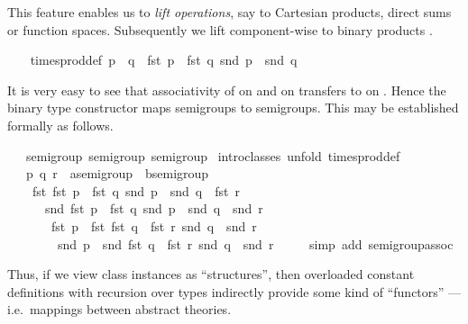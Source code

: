 \begin{isabellebody}
\begin{isamarkuptext}
 This feature enables us to \emph{lift operations}, say to Cartesian
 products, direct sums or function spaces.  Subsequently we lift
 \isa{{\isasymodot}} component-wise to binary products .%
\end{isamarkuptext}%
\ {\isacharparenleft}\isanewline
\ \ times{\isacharunderscore}prod{\isacharunderscore}def{\isacharcolon}\ {\isachardoublequote}p\ {\isasymodot}\ q\ {\isasymequiv}\ {\isacharparenleft}fst\ p\ {\isasymodot}\ fst\ q{\isacharcomma}\ snd\ p\ {\isasymodot}\ snd\ q{\isacharparenright}{\isachardoublequote}%
\begin{isamarkuptext}%
It is very easy to see that associativity of \isa{{\isasymodot}} on 
 and \isa{{\isasymodot}} on  transfers to \isa{{\isasymodot}} on .
 Hence the binary type constructor \isa{{\isasymodot}} maps semigroups to
 semigroups.  This may be established formally as follows.%
\end{isamarkuptext}%
\ {\isacharasterisk}\ {\isacharcolon}{\isacharcolon}\ {\isacharparenleft}semigroup{\isacharcomma}\ semigroup{\isacharparenright}\ semigroup\isanewline
{}\ {\isacharparenleft}intro{\isacharunderscore}classes{\isacharcomma}\ unfold\ times{\isacharunderscore}prod{\isacharunderscore}def{\isacharparenright}\isanewline
\ \ \ p\ q\ r\ {\isacharcolon}{\isacharcolon}\ {\isachardoublequote}{\isacharprime}a{\isasymColon}semigroup\ {\isasymtimes}\ {\isacharprime}b{\isasymColon}semigroup{\isachardoublequote}\isanewline
\ \ \isanewline
\ \ \ \ {\isachardoublequote}{\isacharparenleft}fst\ {\isacharparenleft}fst\ p\ {\isasymodot}\ fst\ q{\isacharcomma}\ snd\ p\ {\isasymodot}\ snd\ q{\isacharparenright}\ {\isasymodot}\ fst\ r{\isacharcomma}\isanewline
\ \ \ \ \ \ snd\ {\isacharparenleft}fst\ p\ {\isasymodot}\ fst\ q{\isacharcomma}\ snd\ p\ {\isasymodot}\ snd\ q{\isacharparenright}\ {\isasymodot}\ snd\ r{\isacharparenright}\ {\isacharequal}\isanewline
\ \ \ \ \ \ \ {\isacharparenleft}fst\ p\ {\isasymodot}\ fst\ {\isacharparenleft}fst\ q\ {\isasymodot}\ fst\ r{\isacharcomma}\ snd\ q\ {\isasymodot}\ snd\ r{\isacharparenright}{\isacharcomma}\isanewline
\ \ \ \ \ \ \ \ snd\ p\ {\isasymodot}\ snd\ {\isacharparenleft}fst\ q\ {\isasymodot}\ fst\ r{\isacharcomma}\ snd\ q\ {\isasymodot}\ snd\ r{\isacharparenright}{\isacharparenright}{\isachardoublequote}\isanewline
\ \ \ \ \ {\isacharparenleft}simp\ add{\isacharcolon}\ semigroup{\isachardot}assoc{\isacharparenright}\isanewline
{}%
\begin{isamarkuptext}%
Thus, if we view class instances as ``structures'', then overloaded
 constant definitions with recursion over types indirectly provide
 some kind of ``functors'' --- i.e.\ mappings between abstract
 theories.%
\end{isamarkuptext}%
\end{isabellebody}%
